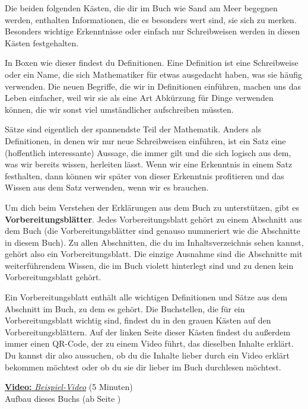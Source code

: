 \documentclass[../main.tex]{subfiles}
\begin{document}
Die beiden folgenden Kästen, die dir im Buch wie Sand am Meer begegnen werden, enthalten Informationen, die es besonders wert sind, sie sich zu merken. Besonders wichtige Erkenntnisse oder einfach nur Schreibweisen werden in diesen Kästen festgehalten.

\begin{definition}{}
    In Boxen wie dieser findest du Definitionen. Eine Definition ist eine Schreibweise oder ein Name, die sich Mathematiker für etwas ausgedacht haben, was sie häufig verwenden. Die neuen Begriffe, die wir in Definitionen einführen, machen uns das Leben einfacher, weil wir sie als eine Art Abkürzung für Dinge verwenden können, die wir sonst viel umständlicher aufschreiben müssten.
\end{definition}

\begin{theorem}{}
    Sätze sind eigentlich der spannendste Teil der Mathematik. Anders als Definitionen, in denen wir nur neue Schreibweisen einführen, ist ein Satz eine (hoffentlich interessante) Aussage, die immer gilt und die sich logisch aus dem, was wir bereits wissen, herleiten lässt. Wenn wir eine Erkenntnis in einem Satz festhalten, dann können wir später von dieser Erkenntnis profitieren und das Wissen aus dem Satz verwenden, wenn wir es brauchen.
\end{theorem}

Um dich beim Verstehen der Erklärungen aus dem Buch zu unterstützen, gibt es \textbf{Vorbereitungsblätter}. Jedes Vorbereitungsblatt gehört zu einem Abschnitt aus dem Buch (die Vorbereitungsblätter sind genauso nummeriert wie die Abschnitte in diesem Buch). Zu allen Abschnitten, die du im Inhaltsverzeichnis sehen kannst, gehört also ein Vorbereitungsblatt. Die einzige Ausnahme sind die Abschnitte mit weiterführendem Wissen, die im Buch violett hinterlegt sind und zu denen kein Vorbereitungsblatt gehört.

Ein Vorbereitungsblatt enthält alle wichtigen Definitionen und Sätze aus dem Abschnitt im Buch, zu dem es gehört. Die Buchstellen, die für ein Vorbereitungsblatt wichtig sind, findest du in den grauen Kästen auf den Vorbereitungsblättern. Auf der linken Seite dieser Kästen findest du außerdem immer einen QR-Code, der zu einem Video führt, das dieselben Inhalte erklärt. Du kannst dir also aussuchen, ob du die Inhalte lieber durch ein Video erklärt bekommen möchtest oder ob du sie dir lieber im Buch durchlesen möchtest.

\begin{video}
    \begin{minipage}{.1\textwidth}
    \end{minipage}
    \begin{minipage}{.9\textwidth}
        \href{https://themrsheldon.github.io/testing/}{\textbf{Video:} \textit{Beispiel-Video}} (5 Minuten)\\
        Aufbau dieses Buchs (ab Seite \pageref{concept})
    \end{minipage}
\end{video}
\end{document}
